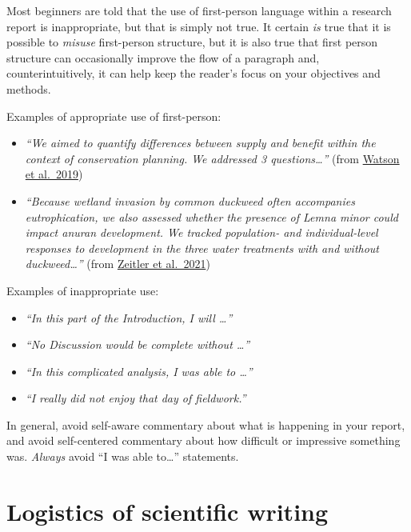 \documentclass[
]{book}
\providecommand{\tightlist}{%
  \setlength{\itemsep}{0pt}\setlength{\parskip}{0pt}}
\begin{document}
Most beginners are told that the use of first-person language within a research report is inappropriate, but that is simply not true. It certain \emph{is} true that it is possible to \emph{misuse} first-person structure, but it is also true that first person structure can occasionally improve the flow of a paragraph and, counterintuitively, it can help keep the reader's focus on your objectives and methods.

Examples of appropriate use of first-person:

\begin{itemize}
\item
  \emph{``We aimed to quantify differences between supply and benefit within the context of conservation planning. We addressed 3 questions\ldots{}''} (from \href{https://conbio.onlinelibrary.wiley.com/doi/full/10.1111/cobi.13276}{Watson et al.~2019})
\item
  \emph{``Because wetland invasion by common duckweed often accompanies eutrophication, we also assessed whether the presence of Lemna minor could impact anuran development. We tracked population- and individual-level responses to development in the three water treatments with and without duckweed\ldots{}''} (from \href{https://www.sciencedirect.com/science/article/pii/S0301479721006332?casa_token=BhsD4GiVQhIAAAAA:78wrLH-vN5gUPvNdX16fyaoHJq8QVQpQ-mqVA6UqxpxLMOFKweuX0YwJtBMLMnmVnfU4e1k}{Zeitler et al.~2021})
\end{itemize}

Examples of inappropriate use:

\begin{itemize}
\tightlist
\item
  \emph{``In this part of the Introduction, I will \ldots{}''}\\
\item
  \emph{``No Discussion would be complete without \ldots{}''}\\
\item
  \emph{``In this complicated analysis, I was able to \ldots{}''}
\item
  \emph{``I really did not enjoy that day of fieldwork.''}
\end{itemize}

In general, avoid self-aware commentary about what is happening in your report, and avoid self-centered commentary about how difficult or impressive something was. \emph{Always} avoid ``I was able to\ldots{}'' statements.

\hypertarget{logistics-of-scientific-writing}{%
\section*{Logistics of scientific writing}\label{logistics-of-scientific-writing}}
\end{document}

